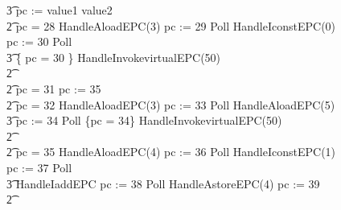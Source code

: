 \begin{figure}[t!]
{\begin{circus}
    \t3 pc := \IF value1 \leq value2   \\
    \t2 {} \circelse pc = 28 \circthen HandleAloadEPC(3) \circseq pc := 29 \circseq Poll \circseq HandleIconstEPC(0) \circseq pc := 30 \circseq Poll \circseq \\
    \t3 \{ pc = 30 \} \circseq HandleInvokevirtualEPC(50) \\
    \t2 {} \cdots {} \\ 
    \t2 {} \circelse pc = 31 \circthen pc := 35 \\
    \t2 {} \circelse pc = 32 \circthen HandleAloadEPC(3) \circseq pc := 33 \circseq Poll \circseq HandleAloadEPC(5) \circseq \\
    \t3 pc := 34 \circseq Poll \circseq \{pc = 34\} \circseq HandleInvokevirtualEPC(50) \\
    \t2 {} \cdots {} \\
    \t2 {} \circelse pc = 35 \circthen HandleAloadEPC(4) \circseq pc := 36 \circseq Poll \circseq HandleIconstEPC(1) \circseq pc := 37 \circseq Poll \circseq \\
    \t3 HandleIaddEPC \circseq pc := 38 \circseq Poll \circseq HandleAstoreEPC(4) \circseq pc := 39 \\
    \t2 {} \cdots {} \\

\end{circus}}
\end{figure}
